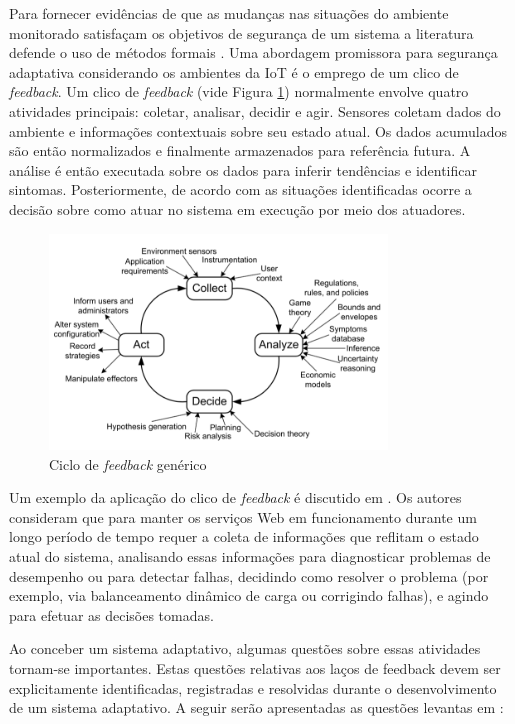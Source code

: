 \documentclass[tid,table]{texufpel} %
\begin{document}
Para fornecer evidências de que as mudanças nas situações do ambiente monitorado satisfaçam os objetivos de segurança de um sistema a literatura defende o uso de métodos formais \cite{lamprecht12, aman15}. Uma abordagem promissora para segurança adaptativa considerando os ambientes da IoT é o emprego de um clico de \textit{feedback}. Um clico de \textit{feedback} (vide Figura \ref{generic-feedback-loop}) normalmente envolve quatro atividades principais: coletar, analisar, decidir e agir. Sensores coletam dados do ambiente e informações contextuais sobre seu estado atual. Os dados acumulados são então normalizados e finalmente armazenados para referência futura.  A análise é então executada sobre os dados para inferir tendências e identificar sintomas. Posteriormente, de acordo com as situações identificadas ocorre a decisão sobre como atuar no sistema em execução por meio dos atuadores. 

\begin{figure}[ht]
\centering
\includegraphics[width=0.8\textwidth]{imagens/generic-feedback-loop.png}
\caption{Ciclo de \textit{feedback} genérico \cite{dobson06}}
\label{generic-feedback-loop}
\end{figure}

Um exemplo da aplicação do clico de \textit{feedback} é discutido em \cite{brun09}. Os autores consideram que para manter os serviços Web em funcionamento durante um longo período de tempo requer a coleta de informações que reflitam o estado atual do sistema, analisando essas informações para diagnosticar problemas de desempenho ou para detectar falhas, decidindo como resolver o problema (por exemplo, via balanceamento dinâmico de carga ou corrigindo falhas), e agindo para efetuar as decisões tomadas.

Ao conceber um sistema adaptativo, algumas questões sobre essas atividades tornam-se importantes. Estas questões relativas aos laços de feedback devem ser explicitamente identificadas, registradas e resolvidas durante o desenvolvimento de um sistema adaptativo. A seguir serão apresentadas as questões levantas em \cite{brun09, lamprecht12}:
\end{document}
